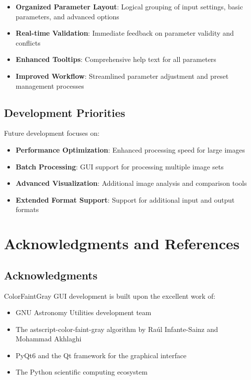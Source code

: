 \documentclass[11pt,a4paper]{article}
\begin{document}
\begin{itemize}[leftmargin=*]
\item \textbf{Organized Parameter Layout}: Logical grouping of input
settings, basic parameters, and advanced options
\item \textbf{Real-time Validation}: Immediate feedback on parameter
validity and conflicts
\item \textbf{Enhanced Tooltips}: Comprehensive help text for all
parameters
\item \textbf{Improved Workflow}: Streamlined parameter adjustment and
preset management processes
\end{itemize}

\subsection{Development Priorities}

Future development focuses on:

\begin{itemize}[leftmargin=*]
\item \textbf{Performance Optimization}: Enhanced processing speed for
large images
\item \textbf{Batch Processing}: GUI support for processing multiple image
sets
\item \textbf{Advanced Visualization}: Additional image analysis and
comparison tools
\item \textbf{Extended Format Support}: Support for additional input and
output formats
\end{itemize}

\section{Acknowledgments and References}

\subsection{Acknowledgments}

ColorFaintGray GUI development is built upon the excellent work of:

\begin{itemize}[leftmargin=*]
\item GNU Astronomy Utilities development team
\item The astscript-color-faint-gray algorithm by Raúl Infante-Sainz and
Mohammad Akhlaghi
\item PyQt6 and the Qt framework for the graphical interface
\item The Python scientific computing ecosystem
\end{itemize}
\end{document}
